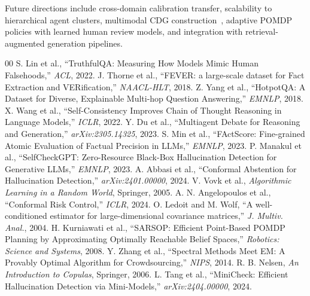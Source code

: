 \documentclass[conference]{IEEEtran}
\begin{document}
Future directions include cross-domain calibration transfer,
scalability to hierarchical agent clusters, multimodal CDG
construction~\cite{pmc2025radiology},
adaptive POMDP policies with learned human review models,
and integration with retrieval-augmented generation pipelines.

\balance

\begin{thebibliography}{00}
 S. Lin et al., ``TruthfulQA: Measuring How Models Mimic Human Falsehoods,'' \textit{ACL}, 2022.
 J. Thorne et al., ``FEVER: a large-scale dataset for Fact Extraction and VERification,'' \textit{NAACL-HLT}, 2018.
 Z. Yang et al., ``HotpotQA: A Dataset for Diverse, Explainable Multi-hop Question Answering,'' \textit{EMNLP}, 2018.
 X. Wang et al., ``Self-Consistency Improves Chain of Thought Reasoning in Language Models,'' \textit{ICLR}, 2022.
 Y. Du et al., ``Multiagent Debate for Reasoning and Generation,'' \textit{arXiv:2305.14325}, 2023.
 S. Min et al., ``FActScore: Fine-grained Atomic Evaluation of Factual Precision in LLMs,'' \textit{EMNLP}, 2023.
 P. Manakul et al., ``SelfCheckGPT: Zero-Resource Black-Box Hallucination Detection for Generative LLMs,'' \textit{EMNLP}, 2023.
 A. Abbasi et al., ``Conformal Abstention for Hallucination Detection,'' \textit{arXiv:2401.00000}, 2024.
 V. Vovk et al., \textit{Algorithmic Learning in a Random World}, Springer, 2005.
 A. N. Angelopoulos et al., ``Conformal Risk Control,'' \textit{ICLR}, 2024.
 O. Ledoit and M. Wolf, ``A well-conditioned estimator for large-dimensional covariance matrices,'' \textit{J. Multiv. Anal.}, 2004.
 H. Kurniawati et al., ``SARSOP: Efficient Point-Based POMDP Planning by Approximating Optimally Reachable Belief Spaces,'' \textit{Robotics: Science and Systems}, 2008.
 Y. Zhang et al., ``Spectral Methods Meet EM: A Provably Optimal Algorithm for Crowdsourcing,'' \textit{NIPS}, 2014.
 R. B. Nelsen, \textit{An Introduction to Copulas}, Springer, 2006.
 L. Tang et al., ``MiniCheck: Efficient Hallucination Detection via Mini-Models,'' \textit{arXiv:2404.00000}, 2024.
\end{thebibliography}
\end{document}
